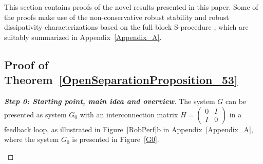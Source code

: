 \documentclass[11pt,a4paper,oneside,DIV=12,headings=small]{scrartcl}
\theoremstyle{plain}
\begin{document}
This section contains proofs of the novel results presented in this paper. Some of the proofs make use of the non-conservative robust stability and robust dissipativity characterizations based on the full block S-procedure \cite{SchererLPV, SchererFromBook}, which are suitably summarized in Appendix~\ref{Appendix_A}.   


\subsection{Proof of Theorem~\ref{OpenSeparationProposition_53}}
\label{Sec6_A}
\medskip

\begin{proof}[\textbf{Step 0: \emph{Starting point, main idea and overview}}]
The system $G$ can be presented as system $G_0$ with an interconnection matrix $H=\left(\begin{smallmatrix} 0 & I \\ I & 0 \end{smallmatrix}\right)$ in a feedback loop, as illustrated in Figure~\ref{RobPerf}b in Appendix~\ref{Appendix_A}, where the system $G_0$ is presented in Figure~\ref{G0}. 


\begin{figure}[h!]
\centering
\end{figure}
\end{proof}
\end{document}
